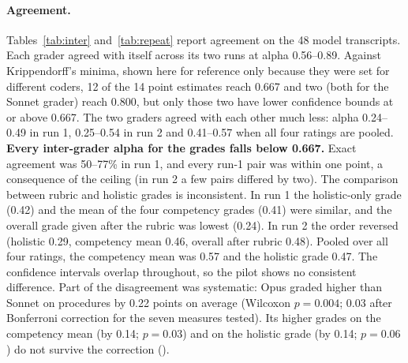 \documentclass[11pt]{article}
\begin{document}
\paragraph{Agreement.} Tables~\ref{tab:inter} and~\ref{tab:repeat} report agreement on the 48 model transcripts. Each grader agreed with itself across its two runs at alpha 0.56--0.89. Against Krippendorff's minima, shown here for reference only because they were set for different coders, 12 of the 14 point estimates reach 0.667 and two (both for the Sonnet grader) reach 0.800, but only those two have lower confidence bounds at or above 0.667. The two graders agreed with each other much less: alpha 0.24--0.49 in run 1, 0.25--0.54 in run 2 and 0.41--0.57 when all four ratings are pooled. \textbf{Every inter-grader alpha for the grades falls below 0.667.} Exact agreement was 50--77\% in run 1, and every run-1 pair was within one point, a consequence of the ceiling (in run 2 a few pairs differed by two). The comparison between rubric and holistic grades is inconsistent. In run 1 the holistic-only grade (0.42) and the mean of the four competency grades (0.41) were similar, and the overall grade given after the rubric was lowest (0.24). In run 2 the order reversed (holistic 0.29, competency mean 0.46, overall after rubric 0.48). Pooled over all four ratings, the competency mean was 0.57 and the holistic grade 0.47. The confidence intervals overlap throughout, so the pilot shows no consistent difference. Part of the disagreement was systematic: Opus graded higher than Sonnet on procedures by 0.22 points on average (Wilcoxon $p = 0.004$; 0.03 after Bonferroni correction for the seven measures tested). Its higher grades on the competency mean (by 0.14; $p = 0.03$) and on the holistic grade (by 0.14; $p = 0.06$) do not survive the correction ().
\end{document}
